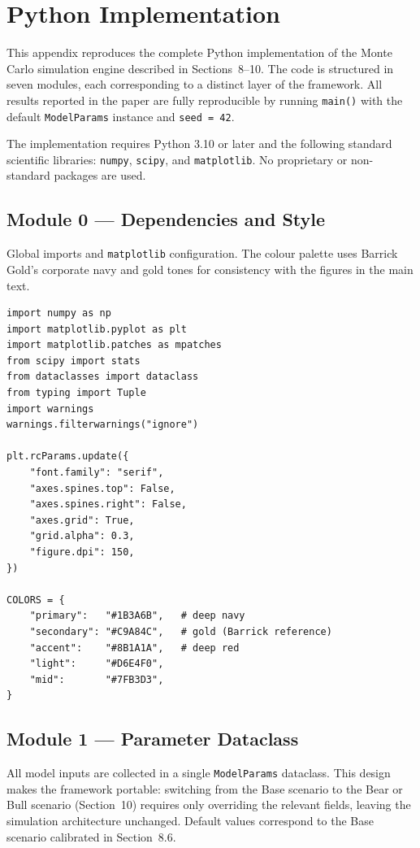\appendix
\chapter{Python Implementation}
\label{appendix:code}

This appendix reproduces the complete Python implementation of the
Monte Carlo simulation engine described in Sections~8--10. The code
is structured in seven modules, each corresponding to a distinct
layer of the framework. All results reported in the paper are fully
reproducible by running \texttt{main()} with the default
\texttt{ModelParams} instance and \texttt{seed = 42}.

The implementation requires Python 3.10 or later and the following
standard scientific libraries: \texttt{numpy}, \texttt{scipy}, and
\texttt{matplotlib}. No proprietary or non-standard packages are used.

\section*{Module 0 — Dependencies and Style}

Global imports and \texttt{matplotlib} configuration. The colour
palette uses Barrick Gold's corporate navy and gold tones for
consistency with the figures in the main text.

\begin{lstlisting}[style=python, caption={Dependencies and global style configuration}]
import numpy as np
import matplotlib.pyplot as plt
import matplotlib.patches as mpatches
from scipy import stats
from dataclasses import dataclass
from typing import Tuple
import warnings
warnings.filterwarnings("ignore")

plt.rcParams.update({
    "font.family": "serif",
    "axes.spines.top": False,
    "axes.spines.right": False,
    "axes.grid": True,
    "grid.alpha": 0.3,
    "figure.dpi": 150,
})

COLORS = {
    "primary":   "#1B3A6B",   # deep navy
    "secondary": "#C9A84C",   # gold (Barrick reference)
    "accent":    "#8B1A1A",   # deep red
    "light":     "#D6E4F0",
    "mid":       "#7FB3D3",
}
\end{lstlisting}

\section*{Module 1 — Parameter Dataclass}

All model inputs are collected in a single \texttt{ModelParams}
dataclass. This design makes the framework portable: switching from
the Base scenario to the Bear or Bull scenario (Section~10) requires
only overriding the relevant fields, leaving the simulation
architecture unchanged. Default values correspond to the Base
scenario calibrated in Section~8.6.

